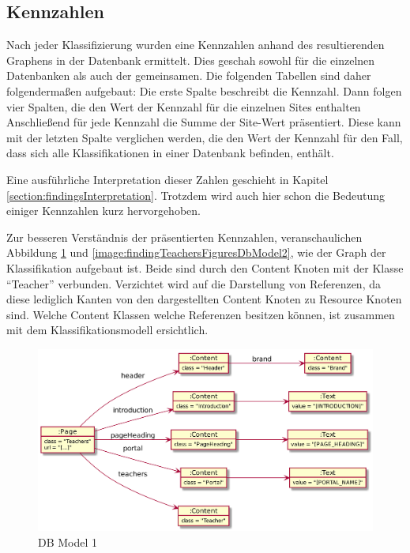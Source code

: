 \subsection{Kennzahlen}
    Nach jeder Klassifizierung wurden eine Kennzahlen anhand des
    resultierenden Graphens in der Datenbank ermittelt.
    Dies geschah sowohl für die einzelnen Datenbanken
    als auch der gemeinsamen.
    Die folgenden Tabellen sind daher folgendermaßen aufgebaut:
    Die erste Spalte beschreibt die Kennzahl.
    Dann folgen vier Spalten, die den Wert der Kennzahl für die einzelnen Sites enthalten
    Anschließend für jede Kennzahl die Summe der Site-Wert präsentiert.
    Diese kann mit der letzten Spalte verglichen werden,
    die den Wert der Kennzahl für den Fall,
    dass sich alle Klassifikationen in einer Datenbank befinden, enthält.

    Eine ausführliche Interpretation dieser Zahlen geschieht in Kapitel \ref{section:findingsInterpretation}.
    Trotzdem wird auch hier schon die Bedeutung einiger Kennzahlen kurz hervorgehoben.

    Zur besseren Verständnis der präsentierten Kennzahlen,
    veranschaulichen Abbildung
    \ref{image:findingTeachersFiguresDbModel1}
    und \ref{image:findingTeachersFiguresDbModel2},
    wie der Graph der Klassifikation aufgebaut ist.
    Beide sind durch den Content Knoten mit der Klasse "`Teacher"' verbunden.
    Verzichtet wird auf die Darstellung von Referenzen,
    da diese lediglich Kanten von den dargestellten Content Knoten
    zu Resource Knoten sind.
    Welche Content Klassen welche Referenzen besitzen können,
    ist zusammen mit dem Klassifikationsmodell ersichtlich.

    \begin{figure}[htb]
        \centering
        \includegraphics[width=\textwidth]{../resources/findings/case-study-1/dbmodel/dbmodel1.png}
        \caption{DB Model 1}
        \label{image:findingTeachersFiguresDbModel1}
    \end{figure}

